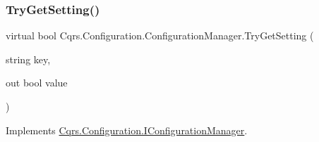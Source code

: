 \mbox{\label{classCqrs_1_1Configuration_1_1ConfigurationManager_a40810d0b9fd2f3d1c4a270681e908c84}} 
\subsubsection{\texorpdfstring{Try\+Get\+Setting()}{TryGetSetting()}\hspace{0.1cm}{\footnotesize\ttfamily [2/2]}}
{\footnotesize\ttfamily virtual bool Cqrs.\+Configuration.\+Configuration\+Manager.\+Try\+Get\+Setting (\begin{DoxyParamCaption}\item[{string}]{key,  }\item[{out bool}]{value }\end{DoxyParamCaption})\hspace{0.3cm}{\ttfamily [virtual]}}



Implements \hyperlink{interfaceCqrs_1_1Configuration_1_1IConfigurationManager_a8389181330999fcb8e30af4dbb56d35e}{Cqrs.\+Configuration.\+I\+Configuration\+Manager}.


